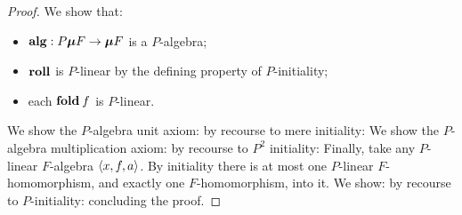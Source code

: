 \begin{proof}
  We show that:
  \begin{itemize}
  \item $\mathbf{alg} : P\boldsymbol\mu F \to \boldsymbol\mu F$ is a $P$-algebra;
  \item $\roll$ is $P$-linear by the defining property of $P$-initiality;
  \item each $\fold f$ is $P$-linear.
  \end{itemize}

  We show the $P$-algebra unit axiom:
  by recourse to mere initiality:
  We show the $P$-algebra multiplication axiom:
  by recourse to $P^2$ initiality:
  Finally, take any $P$-linear $F$-algebra $\left<{{x}, {f}, {a}}\right>$. By
  initiality there is at most one $P$-linear $F$-homomorphism, and
  exactly one $F$-homomorphism, into it. We show:
  by recourse to $P$-initiality:
  concluding the proof.
\end{proof}

